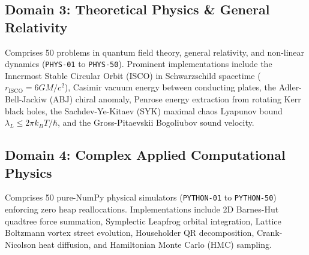 \documentclass[10pt,journal,compsoc,twocolumn]{IEEEtran}
\theoremstyle{definition}
\begin{document}
\begin{table}[h]
\centering
\caption{Sample Empirical Execution Data: Pure Mathematics}
\label{tab:math}
\end{table}

\subsection{Domain 3: Theoretical Physics \& General Relativity}
Comprises 50 problems in quantum field theory, general relativity, and non-linear dynamics (\texttt{PHYS-01} to \texttt{PHYS-50}). Prominent implementations include the Innermost Stable Circular Orbit (ISCO) in Schwarzschild spacetime ($r_{\text{ISCO}} = 6GM/c^2$), Casimir vacuum energy between conducting plates, the Adler-Bell-Jackiw (ABJ) chiral anomaly, Penrose energy extraction from rotating Kerr black holes, the Sachdev-Ye-Kitaev (SYK) maximal chaos Lyapunov bound $\lambda_L \le 2\pi k_B T / \hbar$, and the Gross-Pitaevskii Bogoliubov sound velocity.

\begin{table}[h]
\centering
\caption{Sample Empirical Execution Data: Theoretical Physics}
\label{tab:phys}
\end{table}

\subsection{Domain 4: Complex Applied Computational Physics}
Comprises 50 pure-NumPy physical simulators (\texttt{PYTHON-01} to \texttt{PYTHON-50}) enforcing zero heap reallocations. Implementations include 2D Barnes-Hut quadtree force summation, Symplectic Leapfrog orbital integration, Lattice Boltzmann vortex street evolution, Householder QR decomposition, Crank-Nicolson heat diffusion, and Hamiltonian Monte Carlo (HMC) sampling.
\end{document}
